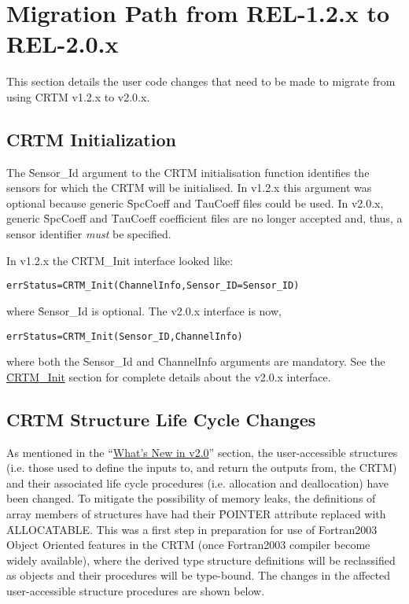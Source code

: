 \chapter{Migration Path from REL-1.2.x to REL-2.0.x}
\label{sec:migration_path}

This section details the user code changes that need to be made to migrate from using CRTM v1.2.x to v2.0.x.

\section{CRTM Initialization}
\label{sec:mp_crtm_init}

The \f{Sensor\_Id} argument to the CRTM initialisation function identifies the sensors for which the CRTM will be initialised. In v1.2.x this argument was optional because generic \f{SpcCoeff} and \f{TauCoeff} files could be used. In v2.0.x, generic \f{SpcCoeff} and \f{TauCoeff} coefficient files are no longer accepted and, thus, a sensor identifier \emph{must} be specified.

In v1.2.x the \f{CRTM\_Init} interface looked like:
\begin{alltt}
  errStatus = CRTM_Init( ChannelInfo, Sensor_ID=Sensor_ID )\end{alltt}
where \f{Sensor\_Id} is optional. The v2.0.x interface is now,
\begin{alltt}
  errStatus = CRTM_Init( Sensor_ID, ChannelInfo )\end{alltt}
where both the \f{Sensor\_Id} and \f{ChannelInfo} arguments are mandatory. See the \hyperref[sec:CRTM_Init_interface]{\f{CRTM\_Init}} section for complete details about the v2.0.x interface.


\section{CRTM Structure Life Cycle Changes}
\label{sec:mp_crtm_life_cycle}

As mentioned in the ``\hyperref[sec:new_interface_changes]{What's New in v2.0}'' section, the user-accessible structures (i.e. those used to define the inputs to, and return the outputs from, the CRTM) and their associated life cycle procedures (i.e. allocation and deallocation) have been changed. To mitigate the possibility of memory leaks, the definitions of array members of structures have had their \f{POINTER} attribute replaced with \f{ALLOCATABLE}. This was a first step in preparation for use of Fortran2003 Object Oriented features in the CRTM (once Fortran2003 compiler become widely available), where the derived type structure definitions will be reclassified as objects and their procedures will be type-bound. The changes in the affected user-accessible structure procedures are shown below.

